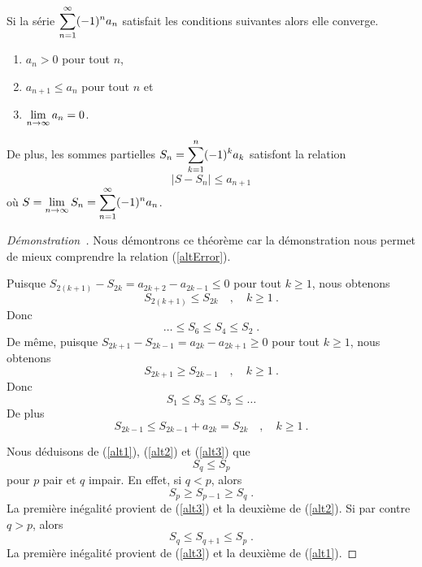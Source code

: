 {\begin{theorem}
Si la série $\displaystyle \sum_{n=1}^\infty (-1)^n a_n$ satisfait les
conditions suivantes alors elle converge.
\begin{enumerate}
\item $a_n >0$ pour tout $n$,
\item $a_{n+1} \leq a_n$ pour tout $n$ et
\item $\displaystyle \lim_{n\rightarrow \infty} a_n = 0$.
\end{enumerate}
De plus, les sommes partielles
$\displaystyle S_n = \sum_{k=1}^n (-1)^k a_k$ satisfont la relation
\begin{equation}\label{altError}
 | S - S_n | \leq a_{n+1}
\end{equation}
où $\displaystyle S = \lim_{n\rightarrow \infty} S_n
= \sum_{n=1}^\infty (-1)^n a_n$.
\label{altTest}
\end{theorem}

\begin{proof}[Démonstration\ \theory]
Nous démontrons ce théorème car la démonstration nous permet de mieux
comprendre la relation (\ref{altError}).

Puisque $S_{2(k+1)} - S_{2k} = a_{2k+2} - a_{2k-1} \leq 0$ pour tout
$k\geq 1$, nous obtenons
\begin{equation}\label{alt1}
S_{2(k+1)} \leq S_{2k} \quad , \quad k\geq 1 \ .
\end{equation}
Donc
\[
\ldots \leq S_6 \leq S_4 \leq S_2 \; .
\]
De même, puisque $S_{2k+1} - S_{2k-1} = a_{2k} - a_{2k+1} \geq 0$ pour
tout $k\geq 1$, nous obtenons
\begin{equation}\label{alt2}
S_{2k+1} \geq S_{2k-1} \quad , \quad  k\geq 1 \ .
\end{equation}
Donc
\[
S_1 \leq S_3 \leq S_5 \leq \ldots
\]
De plus
\begin{equation}\label{alt3}
S_{2k-1} \leq S_{2k-1} + a_{2k} = S_{2k} \quad , \quad k \geq 1 \ .
\end{equation}

Nous déduisons de (\ref{alt1}), (\ref{alt2}) et (\ref{alt3}) que
\begin{equation}\label{alt4}
S_q \leq S_p
\end{equation}
pour $p$ pair et $q$ impair.  En effet, si $q < p$, alors
\[
S_p \geq S_{p-1} \geq S_q \; .
\]
La première inégalité provient de (\ref{alt3}) et la deuxième de
(\ref{alt2}).  Si par contre $q>p$, alors
\[
S_q \leq S_{q+1} \leq S_p \; .
\]
La première inégalité provient de (\ref{alt3}) et la deuxième de
(\ref{alt1}).


\end{proof}}
